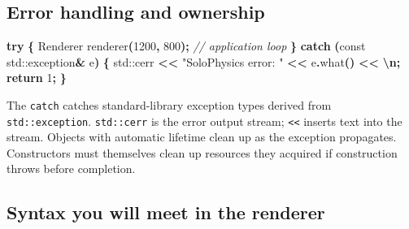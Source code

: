 \documentclass[
  10pt,
  a4paper,
]{article}
\newenvironment{Shaded}{\begin{snugshade}}{\end{snugshade}}
\newcommand{\AttributeTok}[1]{\textcolor[rgb]{0.13,0.29,0.53}{#1}}
\newcommand{\BuiltInTok}[1]{#1}
\newcommand{\CharTok}[1]{\textcolor[rgb]{0.31,0.60,0.02}{#1}}
\newcommand{\CommentTok}[1]{\textcolor[rgb]{0.56,0.35,0.01}{\textit{#1}}}
\newcommand{\ControlFlowTok}[1]{\textcolor[rgb]{0.13,0.29,0.53}{\textbf{#1}}}
\newcommand{\DecValTok}[1]{\textcolor[rgb]{0.00,0.00,0.81}{#1}}
\newcommand{\NormalTok}[1]{#1}
\newcommand{\OperatorTok}[1]{\textcolor[rgb]{0.81,0.36,0.00}{\textbf{#1}}}
\newcommand{\SpecialCharTok}[1]{\textcolor[rgb]{0.81,0.36,0.00}{\textbf{#1}}}
\newcommand{\StringTok}[1]{\textcolor[rgb]{0.31,0.60,0.02}{#1}}
\begin{document}
\subsection{Error handling and
ownership}\label{error-handling-and-ownership}

\begin{Shaded}
\begin{Highlighting}[]
\ControlFlowTok{try} \OperatorTok{\{}
\NormalTok{    Renderer renderer}\OperatorTok{(}\DecValTok{1200}\OperatorTok{,} \DecValTok{800}\OperatorTok{);}
    \CommentTok{// application loop}
\OperatorTok{\}} \ControlFlowTok{catch} \OperatorTok{(}\AttributeTok{const} \BuiltInTok{std::}\NormalTok{exception}\OperatorTok{\&}\NormalTok{ e}\OperatorTok{)} \OperatorTok{\{}
    \BuiltInTok{std::}\NormalTok{cerr }\OperatorTok{\textless{}\textless{}} \StringTok{"SoloPhysics error: "} \OperatorTok{\textless{}\textless{}}\NormalTok{ e}\OperatorTok{.}\NormalTok{what}\OperatorTok{()} \OperatorTok{\textless{}\textless{}} \CharTok{\textquotesingle{}}\SpecialCharTok{\textbackslash{}n}\CharTok{\textquotesingle{}}\OperatorTok{;}
    \ControlFlowTok{return} \DecValTok{1}\OperatorTok{;}
\OperatorTok{\}}
\end{Highlighting}
\end{Shaded}

The \texttt{catch} catches standard-library exception types derived from
\texttt{std::exception}. \texttt{std::cerr} is the error output stream;
\texttt{\textless{}\textless{}} inserts text into the stream. Objects
with automatic lifetime clean up as the exception propagates.
Constructors must themselves clean up resources they acquired if
construction throws before completion.

\subsection{Syntax you will meet in the
renderer}\label{syntax-you-will-meet-in-the-renderer}
\end{document}
